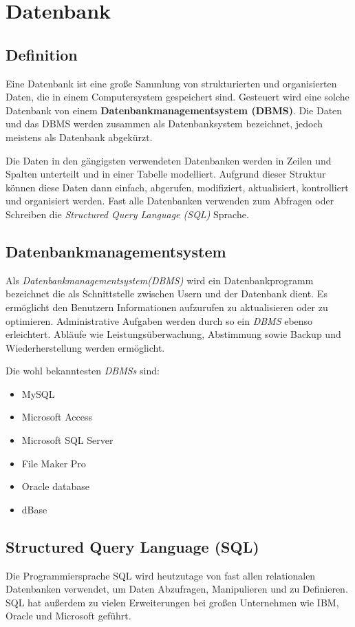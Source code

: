 \section{Datenbank}
\subsection{Definition}
Eine Datenbank ist eine große Sammlung von strukturierten und organisierten Daten,
die in einem Computersystem gespeichert sind. Gesteuert wird eine solche Datenbank von
einem \textbf{Datenbankmanagementsystem (DBMS)}. Die Daten und das DBMS werden zusammen als
Datenbanksystem bezeichnet, jedoch meistens als Datenbank abgekürzt.

Die Daten in den gängigsten verwendeten Datenbanken werden in Zeilen und Spalten unterteilt und
in einer Tabelle modelliert. Aufgrund dieser Struktur können diese Daten dann einfach, abgerufen,
modifiziert, aktualisiert, kontrolliert und organisiert werden. Fast alle Datenbanken verwenden
zum Abfragen oder Schreiben die \textit{Structured Query Language (SQL)} Sprache.
\cite{Datenbank}

\subsection{Datenbankmanagementsystem}
Als \textit{Datenbankmanagementsystem(DBMS)} wird ein Datenbankprogramm bezeichnet die als Schnittstelle
zwischen Usern und der Datenbank dient. Es ermöglicht den Benutzern
Informationen aufzurufen zu aktualisieren oder zu optimieren. Administrative Aufgaben
werden durch so ein \textit{DBMS} ebenso erleichtert. Abläufe wie Leistungsüberwachung,
Abstimmung sowie Backup und Wiederherstellung werden ermöglicht.

Die wohl bekanntesten \textit{DBMSs} sind:

\begin{itemize}
    \item  MySQL
    \item Microsoft Access
    \item Microsoft SQL Server
    \item File Maker Pro
    \item Oracle database
    \item dBase
\end{itemize}

\subsection{Structured Query Language (SQL)}
Die Programmiersprache SQL wird heutzutage von fast allen relationalen Datenbanken verwendet,
um Daten Abzufragen, Manipulieren und zu Definieren. SQL hat außerdem zu vielen Erweiterungen
bei großen Unternehmen wie IBM, Oracle und Microsoft geführt.

